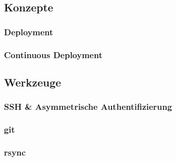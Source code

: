 \subsection{Konzepte} %
\label{sub:konzepte}

\subsubsection{Deployment} %
\label{ssub:deployment}



\subsubsection{Continuous Deployment} %
\label{ssub:continuous_deployment}




\subsection{Werkzeuge} %
\label{sub:werkzeuge}

\subsubsection{SSH \& Asymmetrische Authentifizierung} %
\label{ssub:ssh_&_asymmetrische_authentifizierung}


\subsubsection{git} %
\label{ssub:git}


\subsubsection{rsync} %
\label{ssub:rsync}


